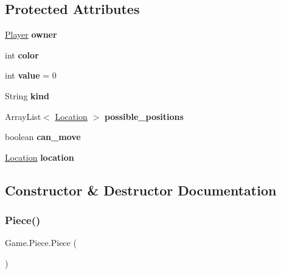 \subsection*{Protected Attributes}
\begin{DoxyCompactItemize}
\item 
\mbox{\label{class_game_1_1_piece_a75996931e37b3a17b2638dfa374fd47b}} 
\hyperlink{class_game_1_1_player}{Player} {\bfseries owner}
\item 
\mbox{\label{class_game_1_1_piece_a68b7c8cc66bcc4d5e5f44fb300892986}} 
int {\bfseries color}
\item 
\mbox{\label{class_game_1_1_piece_a28af46d97aaf22e65132802600c036eb}} 
int {\bfseries value} = 0
\item 
\mbox{\label{class_game_1_1_piece_aed829bf40fb2e53850e907721ea9614e}} 
String {\bfseries kind}
\item 
\mbox{\label{class_game_1_1_piece_a757648998fb60105600446e82ffdc711}} 
Array\+List$<$ \hyperlink{class_game_1_1_location}{Location} $>$ {\bfseries possible\+\_\+positions}
\item 
\mbox{\label{class_game_1_1_piece_a3cc8f2b3246e0a8c2801c3215f30ff1c}} 
boolean {\bfseries can\+\_\+move}
\item 
\mbox{\label{class_game_1_1_piece_ae34b20097d771631ff6bff635d2fde3d}} 
\hyperlink{class_game_1_1_location}{Location} {\bfseries location}
\end{DoxyCompactItemize}


\subsection{Constructor \& Destructor Documentation}
\mbox{\label{class_game_1_1_piece_ac7bf4a99bb03a745e9b857c8091c3304}} 
\subsubsection{\texorpdfstring{Piece()}{Piece()}}
{\footnotesize\ttfamily Game.\+Piece.\+Piece (\begin{DoxyParamCaption}{ }\end{DoxyParamCaption})\hspace{0.3cm}{\ttfamily [inline]}}

